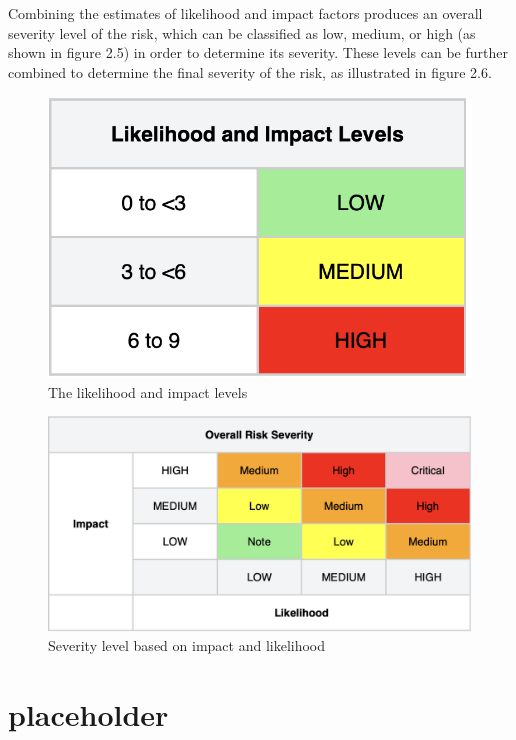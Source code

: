 Combining the estimates of likelihood and impact factors produces an overall severity level of the risk, which can be classified as low, medium, or high (as shown in figure 2.5) in order to determine its severity. These levels can be further combined to determine the final severity of the risk, as illustrated in figure 2.6. 

\begin{figure}[htp]
    \centering
    \includegraphics[scale=0.5]{Images/OWASP-likelihood.png}
    \caption{The likelihood and impact levels}
    \label{fig:my_label}
\end{figure}

\begin{figure}[htp]
    \centering
    \includegraphics[scale=0.4]{Images/OWASP-severity.png}
    \caption{Severity level based on impact and likelihood}
    \label{fig:my_label}
\end{figure}
\section{placeholder}